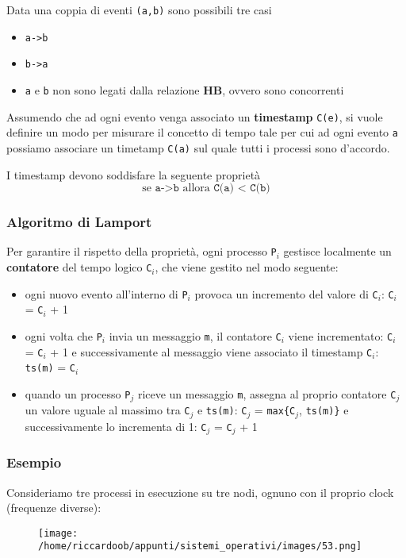 Data una coppia di eventi \texttt{(a,b)} sono possibili tre casi
\begin{itemize}
    \item \texttt{a->b}
    \item \texttt{b->a}
    \item \texttt{a} e \texttt{b} non sono legati dalla relazione \textbf{HB}, ovvero sono concorrenti
\end{itemize}

Assumendo che ad ogni evento venga associato un \textbf{timestamp} \texttt{C(e)}, si vuole definire un modo per misurare il concetto di tempo tale per cui ad ogni evento \texttt{a} possiamo associare un timetamp \texttt{C(a)} sul quale tutti i processi sono d'accordo.

I timestamp devono soddisfare la seguente proprietà
\begin{equation*}
\text{se }\texttt{a->b}\text{ allora }\texttt{C(a) < C(b)}
\end{equation*}

\subsubsection{Algoritmo di Lamport}
Per garantire il rispetto della proprietà, ogni processo \texttt{P}$_i$ gestisce localmente un \textbf{contatore} del tempo logico \texttt{C}$_i$, che viene gestito nel modo seguente:
\begin{itemize}
    \item ogni nuovo evento all'interno di \texttt{P}$_i$ provoca un incremento del valore di \texttt{C}$_i$: \texttt{C}$_i$ = \texttt{C}$_i$ + 1
    \item ogni volta che \texttt{P}$_i$ invia un messaggio \texttt{m}, il contatore \texttt{C}$_i$ viene incrementato: \texttt{C}$_i$ = \texttt{C}$_i$ + 1 e successivamente al messaggio viene associato il timestamp \texttt{C}$_i$: \texttt{ts(m)} = \texttt{C}$_i$
    \item quando un processo \texttt{P}$_j$ riceve un messaggio \texttt{m}, assegna al proprio contatore \texttt{C}$_j$ un valore uguale al massimo tra \texttt{C}$_j$ e \texttt{ts(m)}: \texttt{C}$_j$ = \texttt{max\{}\texttt{C}$_j$, \texttt{ts(m)\}} e successivamente lo incrementa di 1: \texttt{C}$_j$ = \texttt{C}$_j$ + 1
\end{itemize}

\subsubsection{Esempio}
Consideriamo tre processi in esecuzione su tre nodi, ognuno con il proprio clock (frequenze diverse):
\begin{figure}[H]
    \centering
    \texttt{[image: /home/riccardoob/appunti/sistemi\_operativi/images/53.png]}
\end{figure}

